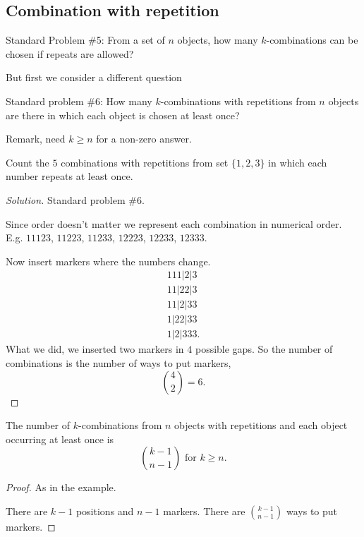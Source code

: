 \documentclass[10pt, a4paper]{article}
\begin{document}
\subsection{Combination with repetition}
Standard Problem \#5: From a set of $n$ objects,
how many $k$-combinations can be chosen if repeats are allowed?

But first we consider a different question

Standard problem \#6: How many $k$-combinations with repetitions from $n$ objects are there in which each object is chosen at least once?

Remark, need $k \geq n$ for a non-zero answer.

\begin{example}
    Count the $5$ combinations with repetitions from set $\{1, 2, 3\}$ in which each number repeats at least once.
    \begin{proof}[Solution]\renewcommand{\qedsymbol}{}
        Standard problem \#6.

        Since order doesn't matter we represent each combination in numerical order.
        E.g. $11123$, $11223$, $11233$, $12223$, $12233$, $12333$.

        Now insert markers where the numbers change.
        \begin{align*}
            111|2|3 \\
            11|22|3 \\
            11|2|33 \\
            1|22|33 \\
            1|2|333.
        \end{align*}
        What we did, we inserted two markers in $4$ possible gaps.
        So the number of combinations is the number of ways to put markers,
        \[
        \binom{4}{2} = 6.
        \]
    \end{proof}
\end{example}

\begin{theorem}\label{disc_thm_kcombwrep}
    The number of $k$-combinations from $n$ objects with repetitions and each object occurring at least once is
    \[
    \binom{k - 1}{n - 1}\text{ for } k \geq n.
    \]
    \begin{proof}
        As in the example.

        There are $k - 1$ positions and $n - 1$ markers.
        There are $\binom{k - 1}{n - 1}$ ways to put markers.
    \end{proof}
\end{theorem}
\end{document}
